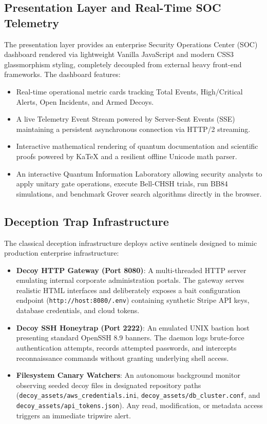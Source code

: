 \documentclass[journal,10pt]{IEEEtran}
\begin{document}
\subsection{Presentation Layer and Real-Time SOC Telemetry}
The presentation layer provides an enterprise Security Operations Center (SOC) dashboard rendered via lightweight Vanilla JavaScript and modern CSS3 glassmorphism styling, completely decoupled from external heavy front-end frameworks. The dashboard features:
\begin{itemize}
    \item Real-time operational metric cards tracking Total Events, High/Critical Alerts, Open Incidents, and Armed Decoys.
    \item A live Telemetry Event Stream powered by Server-Sent Events (SSE) maintaining a persistent asynchronous connection via HTTP/2 streaming.
    \item Interactive mathematical rendering of quantum documentation and scientific proofs powered by KaTeX and a resilient offline Unicode math parser.
    \item An interactive Quantum Information Laboratory allowing security analysts to apply unitary gate operations, execute Bell-CHSH trials, run BB84 simulations, and benchmark Grover search algorithms directly in the browser.
\end{itemize}

\subsection{Deception Trap Infrastructure}
The classical deception infrastructure deploys active sentinels designed to mimic production enterprise infrastructure:
\begin{itemize}
    \item \textbf{Decoy HTTP Gateway (Port 8080)}: A multi-threaded HTTP server emulating internal corporate administration portals. The gateway serves realistic HTML interfaces and deliberately exposes a bait configuration endpoint (\texttt{http://host:8080/.env}) containing synthetic Stripe API keys, database credentials, and cloud tokens.
    \item \textbf{Decoy SSH Honeytrap (Port 2222)}: An emulated UNIX bastion host presenting standard OpenSSH 8.9 banners. The daemon logs brute-force authentication attempts, records attempted passwords, and intercepts reconnaissance commands without granting underlying shell access.
    \item \textbf{Filesystem Canary Watchers}: An autonomous background monitor observing seeded decoy files in designated repository paths (\texttt{decoy\_assets/aws\_credentials.ini}, \texttt{decoy\_assets/db\_cluster.conf}, and \texttt{decoy\_assets/api\_tokens.json}). Any read, modification, or metadata access triggers an immediate tripwire alert.
\end{itemize}
\end{document}
